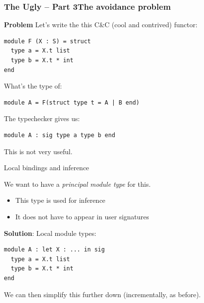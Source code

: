\documentclass[aspectratio=169,dvipsnames,svgnames,10pt]{beamer}
\begin{document}
\begin{frame}
  \frametitle{The Ugly -- Part 3\hfill The avoidance problem}

  \textbf{Problem} Let's write the this C\&C (cool and contrived) functor:
\begin{verbatim}
module F (X : S) = struct
  type a = X.t list
  type b = X.t * int
end
\end{verbatim}

  What's the type of:
\begin{verbatim}
module A = F(struct type t = A | B end)
\end{verbatim}
  \pause
  The typechecker gives us:
\begin{verbatim}
module A : sig type a type b end
\end{verbatim}
  This is not very useful. 
\end{frame}

\begin{frame}{Local bindings and inference}

  We want to have a \emph{principal module type} for this.
  \begin{itemize}
  \item This type is used for inference
  \item It does not have to appear in user signatures
  \end{itemize}
  \pause
  
  {\bf Solution}: Local module types:
\begin{verbatim}
module A : let X : ... in sig
  type a = X.t list
  type b = X.t * int
end
\end{verbatim}

  We can then simplify this further down (incrementally, as before).
\end{frame}
\end{document}
